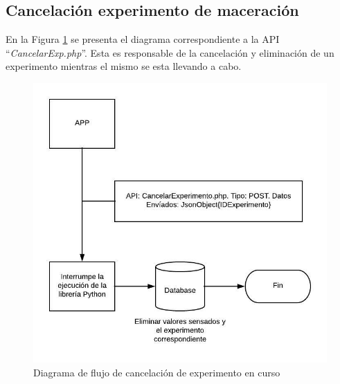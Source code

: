         \subsection{Cancelación experimento de maceración}
            \par En la Figura \ref{fig:ApiCancelExp} se presenta el diagrama correspondiente a la API ``\textit{CancelarExp.php}''. Esta es responsable de la cancelación y eliminación de un experimento mientras el mismo se esta llevando a cabo.
            \begin{figure}[htb]
                \centering
                \includegraphics{DiagramaCancelExp.jpeg}
                \caption{Diagrama de flujo de cancelación de experimento en curso}
                \label{fig:ApiCancelExp}
            \end{figure}
        